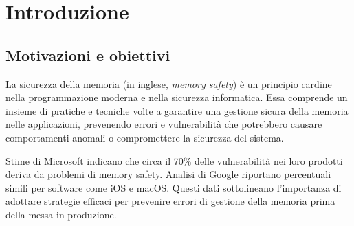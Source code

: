 \chapter{Introduzione}
\label{cha:introduction}

\section*{Motivazioni e obiettivi}
\label{sec:motivation} La sicurezza della memoria (in inglese, \textit{memory
safety}) è un principio cardine nella programmazione moderna e nella sicurezza
informatica. Essa comprende un insieme di pratiche e tecniche volte a garantire una
gestione sicura della memoria nelle applicazioni, prevenendo errori e
vulnerabilità che potrebbero causare comportamenti anomali o compromettere la
sicurezza del sistema.

Stime di Microsoft\cite{microsoft_proactive_approach} indicano che circa il 70\%
delle vulnerabilità nei loro prodotti deriva da problemi di memory safety. Analisi
di Google\cite{google_memory_safety} riportano percentuali simili per software
come iOS e macOS. Questi dati sottolineano l'importanza di adottare strategie efficaci
per prevenire errori di gestione della memoria prima della messa in produzione.


